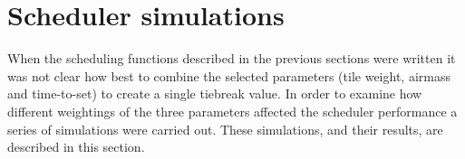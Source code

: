 
\section{Scheduler simulations}
\label{sec:scheduler_sims}


\begin{colsection}

When the scheduling functions described in the previous sections were written it was not clear how best to combine the selected parameters (tile weight, airmass and time-to-set) to create a single tiebreak value. In order to examine how different weightings of the three parameters affected the scheduler performance a series of simulations were carried out. These simulations, and their results, are described in this section.

\end{colsection}


